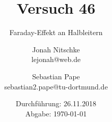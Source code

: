 

\title{Versuch 46}
\subtitle{Faraday-Effekt an Halbleitern}
\author{Jonah Nitschke\\
        lejonah@web.de \and
        Sebastian Pape\\
        sebastian2.pape@tu-dortmund.de}
\date{Durchführung: 26.11.2018\\
      Abgabe: \today}



\maketitle
\newpage
\setcounter{page}{1}


\newpage


\printbibliography


